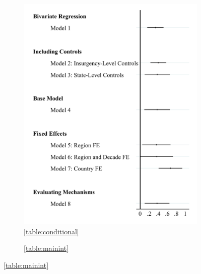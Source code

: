 \documentclass[12pt, letterpaper]{article}
\begin{document}
\newpage
\begin{figure}[h]
\setcounter{figure}{0}
\renewcommand\thefigure{A.\arabic{figure}}
\caption{\textbf{Secessionist Coefficient Estimates}}
\label{figure:coef}
\centering
	\begin{subfigure}{0.45\textwidth}
    \centering
    \caption{\autoref{table:conditional}} \label{figure:coefmain}
    \includegraphics[width=\textwidth]{coefmain.pdf}
    \end{subfigure}
% 
	\begin{subfigure}{0.45\textwidth}
    \centering
    \caption{\autoref{table:mainint}} \label{figure:coefmainint}

\end{subfigure}
\end{figure}
\end{document}
